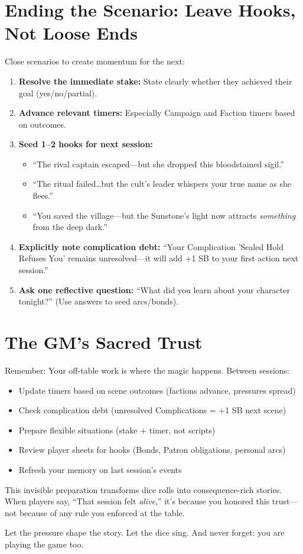 \section{Ending the Scenario: Leave Hooks, Not Loose Ends}
Close scenarios to create momentum for the next:
\begin{enumerate}
  \item \textbf{Resolve the immediate stake:} State clearly whether they achieved their goal (yes/no/partial).
  \item \textbf{Advance relevant timers:} Especially Campaign and Faction timers based on outcomes.
  \item \textbf{Seed 1--2 hooks for next session:} 
    \begin{itemize}
      \item ``The rival captain escaped---but she dropped this bloodstained sigil.''
      \item ``The ritual failed\dots but the cult's leader whispers your true name as she flees.''
      \item ``You saved the village---but the Sunstone's light now attracts \textit{something} from the deep dark.''
    \end{itemize}
  \item \textbf{Explicitly note complication debt:} ``Your Complication 'Sealed Hold Refuses You' remains unresolved---it will add +1 SB to your first action next session.''
  \item \textbf{Ask one reflective question:} ``What did you learn about your character tonight?'' (Use answers to seed arcs/bonds).
\end{enumerate}

\section{The GM's Sacred Trust}
Remember: Your off-table work is where the magic happens. Between sessions:
\begin{itemize}
  \item Update timers based on scene outcomes (factions advance, pressures spread)
  \item Check complication debt (unresolved Complications = +1 SB next scene)
  \item Prepare flexible situations (stake + timer, not scripts)
  \item Review player sheets for hooks (Bonds, Patron obligations, personal arcs)
  \item Refresh your memory on last session's events
\end{itemize}
This invisible preparation transforms dice rolls into consequence-rich stories. When players say, ``That session felt \textit{alive},'' it's because you honored this trust---not because of any rule you enforced at the table.

Let the pressure shape the story. Let the dice sing. And never forget: you are playing the game too.